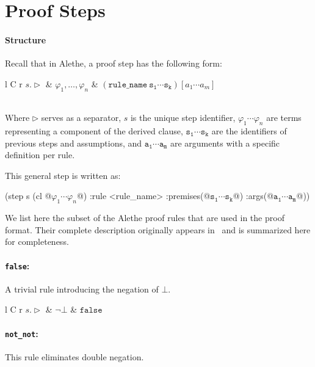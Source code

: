 \section{Proof Steps}
 
\paragraph{Structure}
Recall that in Alethe, a proof step has the following form:

\noindent\begin{tabularx}{\linewidth}{ l C r }
		$s.\triangleright$ & 
		$\varphi_1,\dots,\varphi_n$ & 
		${\mathtt{(rule\_name \: s_1\cdots s_k)}[a_1 \cdots a_m]}$
\end{tabularx}\\
Where $\triangleright$ serves as a separator, $s$ is the unique step identifier, $\varphi_1 \cdots\varphi_n$ are terms representing a component of the derived clause, $\mathtt{s_1 \cdots s_k}$ are the identifiers of previous steps and assumptions, and  $\mathtt{a_1 \cdots a_m}$ are arguments with a specific definition per rule.

This general step is written as:

\begin{code}[style=lbnf,escapechar=@]
	(step s (cl @$\varphi_1 \cdots\varphi_n$@) :rule <rule_name> :premises(@$\mathtt{s_1 \cdots s_k}$@)
	                                      :args(@$\mathtt{a_1 \cdots a_m}$@))
\end{code}

We list here the subset of the Alethe proof rules that are used in the
\vnnlib{} proof format. Their complete description originally appears
in~\cite{ScFlBaFo21} and is summarized here for completeness.

\paragraph{\texttt{false}:} A trivial rule introducing the negation of $\bot$.

\noindent\begin{tabularx}{\linewidth}{ l C r }
	$s.\triangleright$ & 
	$\lnot \bot$ & 
	${\mathtt{false}}$
\end{tabularx}

\paragraph{\texttt{not\_not}:} This rule eliminates double negation.

